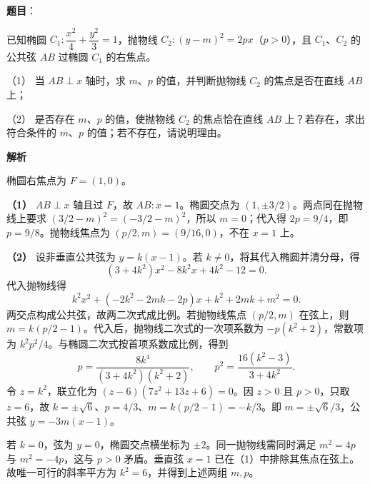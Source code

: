 \begin{answer}

\textbf{题目}：

已知椭圆 $C_1:\dfrac{x^2}{4}+\dfrac{y^2}{3}=1$，抛物线 $C_2:(y-m)^2=2px$（$p>0$），且 $C_1$、$C_2$ 的公共弦 $AB$ 过椭圆 $C_1$ 的右焦点。

（1） 当 $AB\perp x$ 轴时，求 $m$、$p$ 的值，并判断抛物线 $C_2$ 的焦点是否在直线 $AB$ 上；

（2） 是否存在 $m$、$p$ 的值，使抛物线 $C_2$ 的焦点恰在直线 $AB$ 上？若存在，求出符合条件的 $m$、$p$ 的值；若不存在，请说明理由。

\textbf{解析}

椭圆右焦点为 $F=(1,0)$。

\textbf{（1）} $AB\perp x$ 轴且过 $F$，故 $AB:x=1$。椭圆交点为 $(1,\pm3/2)$。两点同在抛物线上要求 $(3/2-m)^2=(-3/2-m)^2$，所以 $m=0$；代入得 $2p=9/4$，即 $p=9/8$。抛物线焦点为 $(p/2,m)=(9/16,0)$，不在 $x=1$ 上。

\textbf{（2）} 设非垂直公共弦为 $y=k(x-1)$。若 $k\ne0$，将其代入椭圆并清分母，得
\nopagebreak[4]
\[
(3+4k^2)x^2-8k^2x+4k^2-12=0.
\]
代入抛物线得
\nopagebreak[4]
\[
k^2x^2+(-2k^2-2mk-2p)x+k^2+2mk+m^2=0.
\]
两交点构成公共弦，故两二次式成比例。若抛物线焦点 $(p/2,m)$ 在弦上，则 $m=k(p/2-1)$。代入后，抛物线二次式的一次项系数为 $-p(k^2+2)$，常数项为 $k^2p^2/4$。与椭圆二次式按首项系数成比例，得到
\nopagebreak[4]
\[
p=\frac{8k^4}{(3+4k^2)(k^2+2)},\qquad p^2=\frac{16(k^2-3)}{3+4k^2}.
\]
令 $z=k^2$，联立化为 $(z-6)(7z^2+13z+6)=0$。因 $z>0$ 且 $p>0$，只取 $z=6$，故 $k=\pm\sqrt6$、$p=4/3$、$m=k(p/2-1)=-k/3$。即 $m=\pm\sqrt6/3$，公共弦 $y=-3m(x-1)$。

若 $k=0$，弦为 $y=0$，椭圆交点横坐标为 $\pm2$。同一抛物线需同时满足 $m^2=4p$ 与 $m^2=-4p$，这与 $p>0$ 矛盾。垂直弦 $x=1$ 已在（1）中排除其焦点在弦上。故唯一可行的斜率平方为 $k^2=6$，并得到上述两组 $m,p$。



\end{answer}